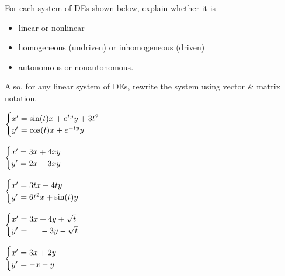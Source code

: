 \documentclass[boxes]{gsypset}
\begin{document}
	\begin{problem}
		For each system of DEs shown below, explain whether it is
		\begin{itemize}
			\item linear or nonlinear
			\item homogeneous (undriven) or inhomogeneous (driven)
			\item autonomous or nonautonomous.
		\end{itemize}
		Also, for any linear system of DEs, rewrite the system using vector \&
		matrix notation.
		\begin{subproblems}
			\subproblem
				$\begin{cases}
					x'&\hspace{-.1in}=\sin(t)x+e^{ty}y+3t^2 \\
					y'&\hspace{-.1in}=\cos(t)x+e^{-ty}y
				\end{cases}$
				\begin{solution}
					
				\end{solution}
			\subproblem
				$\begin{cases}
					x'&\hspace{-.1in}=3x+4xy \\
					y'&\hspace{-.1in}=2x-3xy
				\end{cases}$
				\begin{solution}
					
				\end{solution}
			\subproblem
				$\begin{cases}
					x'&\hspace{-.1in}=3tx+4ty\\
					y'&\hspace{-.1in}=6t^2x+\sin(t)y
				\end{cases}$
				\begin{solution}
					
				\end{solution}
			\subproblem
				$\begin{cases}
					x'&\hspace{-.1in}=3x+4y+\sqrt{t}\\
					y'&\hspace{-.1in}=\mbox{\hspace{4.5mm}}-3y-\sqrt{t}
				\end{cases}$
				\begin{solution}
					
				\end{solution}
			\subproblem
				$\begin{cases}
					x'&\hspace{-.1in}=3x+2y\\
					y'&\hspace{-.1in}=-x-y
				\end{cases}$
				\begin{solution}
					
				\end{solution}
		\end{subproblems}
	\end{problem}
	
\end{document}
